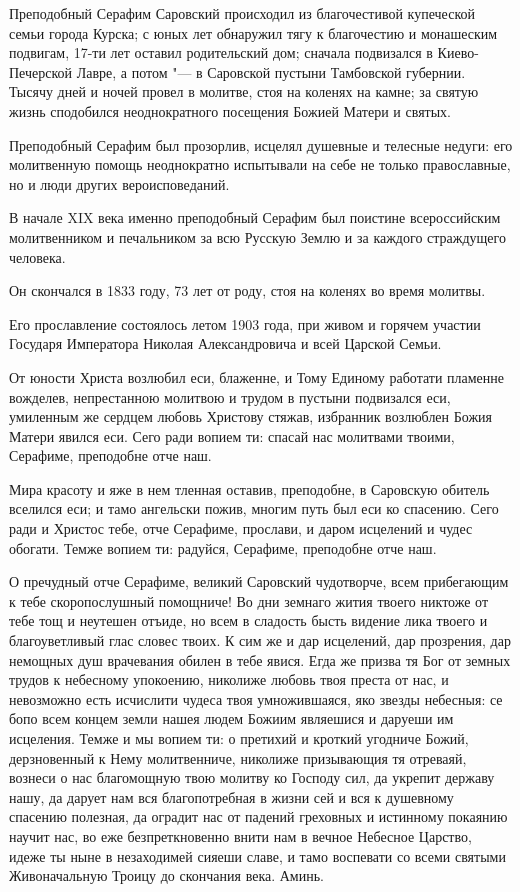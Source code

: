 Преподобный Серафим Саровский происходил из благочестивой купеческой семьи города Курска; с юных лет обнаружил тягу к благочестию и монашеским подвигам, 17-ти лет оставил родительский дом; сначала подвизался в Киево-Печерской Лавре, а потом "--- в Саровской пустыни Тамбовской губернии. Тысячу дней и ночей провел в молитве, стоя на коленях на камне; за святую жизнь сподобился неоднократного посещения Божией Матери и святых. 


Преподобный Серафим был прозорлив, исцелял душевные и телесные недуги: его молитвенную помощь неоднократно испытывали на себе не только православные, но и люди других вероисповеданий. 


В начале XIX века именно преподобный Серафим был поистине всероссийским молитвенником и печальником за всю Русскую Землю и за каждого страждущего человека. 


Он скончался в 1833 году, 73 лет от роду, стоя на коленях во время молитвы. 


Его прославление состоялось летом 1903 года, при живом и горячем участии Государя Императора Николая Александровича и всей Царской Семьи.




От юности Христа возлюбил еси, блаженне, и Тому Единому работати пламенне вожделев, непрестанною молитвою и трудом в пустыни подвизался еси, умиленным же сердцем любовь Христову стяжав, избранник возлюблен Божия Матери явился еси. Сего ради вопием ти: спасай нас молитвами твоими, Серафиме, преподобне отче наш.





Мира красоту и яже в нем тленная оставив, преподобне, в Саровскую обитель вселился еси; и тамо ангельски пожив, многим путь был еси ко спасению. Сего ради и Христос тебе, отче Серафиме, прослави, и даром исцелений и чудес обогати. Темже вопием ти: радуйся, Серафиме, преподобне отче наш.




О пречудный отче Серафиме, великий Саровский чудотворче, всем прибегающим к тебе скоропослушный помощниче! Во дни земнаго жития твоего никтоже от тебе тощ и неутешен отъиде, но всем в сладость бысть видение лика твоего и благоуветливый глас словес твоих. К сим же и дар исцелений, дар прозрения, дар немощных душ врачевания обилен в тебе явися. Егда же призва тя Бог от земных трудов к небесному упокоению, николиже любовь твоя преста от нас, и невозможно есть исчислити чудеса твоя умножившаяся, яко звезды небесныя: се бопо всем концем земли нашея людем Божиим являешися и даруеши им исцеления. Темже и мы вопием ти: о претихий и кроткий угодниче Божий, дерзновенный к Нему молитвенниче, николиже призывающия тя отреваяй, вознеси о нас благомощную твою молитву ко Господу сил, да укрепит державу нашу, да дарует нам вся благопотребная в жизни сей и вся к душевному спасению полезная, да оградит нас от падений греховных и истинному покаянию научит нас, во еже безпреткновенно внити нам в вечное Небесное Царство, идеже ты ныне в незаходимей сияеши славе, и тамо воспевати со всеми святыми Живоначальную Троицу до скончания века. Аминь.


